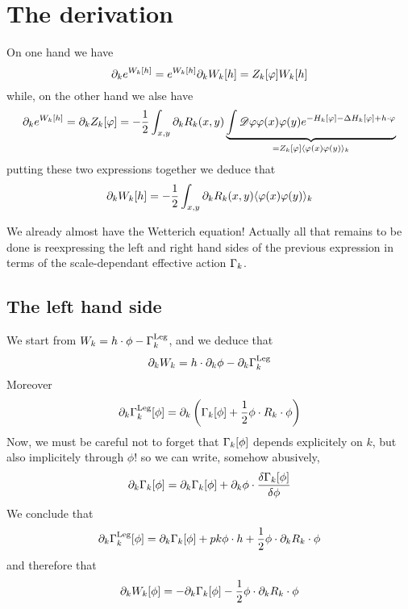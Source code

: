 \section{The derivation}
On one hand we have
\begin{equation}
\partial_{k} e^{W_k[h]} = e^{W_k[h]} \partial_{k} W_k[h] = Z_k[\varphi] W_k[h]
\end{equation}
while, on the other hand we alse have
\begin{equation}
\partial_{k} e^{W_k[h]} = \partial_{k} Z_k[\varphi] = - \frac{1}{2} \int_{x,y} \partial_{k} R_k(x,y) \underbrace{ \int  \mathscr{D}  \varphi \varphi(x) \varphi(y) e^{-H_k[\varphi] - \Delta H_k[\varphi] + h \cdot \varphi} }_{=Z_k[\varphi] \langle \varphi(x) \varphi(y) \rangle_k}
\end{equation}
putting these two expressions together we deduce that
\begin{equation}
\partial_{k} W_k[h] = -\frac{1}{2} \int_{x,y} \partial_{k} R_k(x,y) \langle \varphi(x) \varphi(y) \rangle_k
\end{equation}

We already almost have the Wetterich equation! Actually all that remains to be done is reexpressing the left and right hand sides of the previous expression in terms of the scale-dependant effective action $\Gamma_k$.

\subsection{The left hand side}
We start from $W_k = h \cdot \phi - \Gamma_k^{\text{Leg}} $, and we deduce that
\begin{equation}
\partial_{k} W_k = h \cdot \partial_{k} \phi - \partial_{k} \Gamma_k^{\text{Leg}}
\end{equation}
Moreover 
\begin{equation}
\partial_{k} \Gamma_k^{\text{Leg}}[\phi] = \partial_{k} \left( \Gamma_k[\phi] + \frac{1}{2} \phi \cdot R_k \cdot \phi \right) 
\end{equation}
Now, we must be careful not to forget that $\Gamma_k[\phi]$ depends explicitely on $k$, but also implicitely through $\phi$!
so we can write, somehow abusively,
\begin{equation}
\partial_{k} \Gamma_k[\phi] = \partial_{k} \Gamma_k[\phi] + \partial_{k} \phi \cdot \frac{\delta \Gamma_k[\phi]}{\delta \phi}
\end{equation}
We conclude that
\begin{equation}
\partial_{k} \Gamma_k^{\text{Leg}}[\phi] = \partial_{k}\Gamma_k[\phi] + p{k} \phi \cdot h + \frac{1}{2} \phi \cdot \partial_{k} R_k \cdot \phi
\end{equation}
and therefore that
\begin{equation}
\label{eq:lhs}
\partial_{k} W_k[\phi] = - \partial_{k} \Gamma_k[\phi] - \frac{1}{2}\phi \cdot \partial_{k} R_k \cdot \phi
\end{equation}

